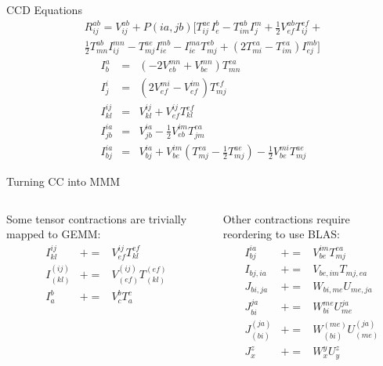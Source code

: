 \documentclass[11pt]{beamer}
\begin{document}
\begin{frame}{CCD Equations}
    \begin{eqnarray}\nonumber
        R_{ij}^{ab} =  V_{ij}^{ab} + P(ia,jb) \bigg[ T_{ij}^{ae} I_e^b - T_{im}^{ab} I_j^m + \frac{1}{2} V_{ef}^{ab} T_{ij}^{ef} + \nonumber \\
        \frac{1}{2} T_{mn}^{ab} I_{ij}^{mn} - T_{mj}^{ae} I_{ie}^{mb} - I_{ie}^{ma} T_{mj}^{eb} + (2 T_{mi}^{ea} - T_{im}^{ea}) I_{ej}^{mb} \bigg] \nonumber
    \end{eqnarray}
    \begin{eqnarray}
        I_b^a &=& (-2 V_{eb}^{mn} + V_{be}^{mn}) T_{mn}^{ea} \nonumber \\
        I_j^i &=& (2 V_{ef}^{mi} - V_{ef}^{im}) T_{mj}^{ef} \nonumber \\
        I_{kl}^{ij} &=& V_{kl}^{ij} + V_{ef}^{ij} T_{kl}^{ef} \nonumber \\
        I_{jb}^{ia} &=& V_{jb}^{ia} - \frac{1}{2} V_{eb}^{im} T_{jm}^{ea} \nonumber \\
        I_{bj}^{ia} &=& V_{bj}^{ia} + V_{be}^{im} (T_{mj}^{ea} - \frac{1}{2} T_{mj}^{ae}) - \frac{1}{2} V_{be}^{mi} T_{mj}^{ae} \nonumber
    \end{eqnarray}
\end{frame}

\begin{frame}{Turning CC into MMM}
 \begin{columns}[T]
  \begin{column}{0.45\linewidth}
    Some tensor contractions are trivially mapped to GEMM:
    \begin{eqnarray}
        I_{kl}^{ij} &+=& V_{ef}^{ij} T_{kl}^{ef} \nonumber \\
        I_{(kl)}^{(ij)} &+=& V_{(ef)}^{(ij)} T_{(kl)}^{(ef)} \nonumber \\
        I_{a}^{b} &+=& V_{c}^{b} T_{a}^{c} \nonumber
    \end{eqnarray}
   \end{column}
   \begin{column}{0.45\linewidth}
    Other contractions require reordering to use BLAS:
    \begin{eqnarray}
        I_{bj}^{ia} &+=& V_{be}^{im} T_{mj}^{ea} \nonumber \\
        I_{bj,ia} &+=& V_{be,im} T_{mj,ea} \nonumber \\
        J_{bi,ja} &+=& W_{bi,me} U_{me,ja} \nonumber \\
        J_{bi}^{ja} &+=& W_{bi}^{me} U_{me}^{ja} \nonumber \\
        J_{(bi)}^{(ja)} &+=& W_{(bi)}^{(me)} U_{(me)}^{(ja)} \nonumber \\
        J_{x}^{z} &+=& W_{x}^{y} U_{y}^{z} \nonumber
    \end{eqnarray}
   \end{column}
  \end{columns}
\end{frame}
\end{document}
